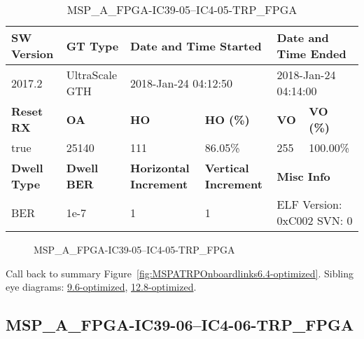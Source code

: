 \begin{table}[h]
\centering
\caption{MSP\_A\_FPGA-IC39-05--IC4-05-TRP\_FPGA}
\label{tab:MSPAFPGAIC3905IC405TRPFPGA6.4-optimized}
\begin{tabular}{@{}|l|l|l|l|l|l|@{}}
\toprule
\textbf{SW Version}                & \textbf{GT Type}   & \multicolumn{2}{l|}{\textbf{Date and Time Started}}            & \multicolumn{2}{l|}{\textbf{Date and Time Ended}}        \\ \midrule
2017.2                       & UltraScale GTH          & \multicolumn{2}{l|}{2018-Jan-24 04:12:50}                   & \multicolumn{2}{l|}{2018-Jan-24 04:14:00}               \\ \midrule
\textbf{Reset RX}                  & \textbf{OA} & \textbf{HO}   & \textbf{HO (\%)} & \textbf{VO} & \textbf{VO (\%)} \\ \midrule
true & 25140        & 111          & 86.05\%        & 255        & 100.00\%       \\ \midrule
\textbf{Dwell Type}                & \textbf{Dwell BER} & \textbf{Horizontal Increment} & \textbf{Vertical Increment}    & \multicolumn{2}{l|}{\textbf{Misc Info}}                  \\ \midrule
BER                            & 1e-7        & 1        & 1           & \multicolumn{2}{l|}{ELF Version: 0xC002 SVN: 0}                         \\ \bottomrule
\end{tabular}
\end{table}

\begin{figure}[h]
\caption{MSP\_A\_FPGA-IC39-05--IC4-05-TRP\_FPGA} \label{fig:MSPAFPGAIC3905IC405TRPFPGA6.4-optimized}
\end{figure}

Call back to summary Figure~\ref{fig:MSPATRPOnboardlinks6.4-optimized}.
Sibling eye diagrams: \hyperref[sec:MSPAFPGAIC3905IC405TRPFPGA9.6-optimized]{9.6-optimized}, \hyperref[sec:MSPAFPGAIC3905IC405TRPFPGA12.8-optimized]{12.8-optimized}.

\clearpage
\newpage


\subsection{MSP\_A\_FPGA-IC39-06--IC4-06-TRP\_FPGA}\label{sec:MSPAFPGAIC3906IC406TRPFPGA6.4-optimized}


